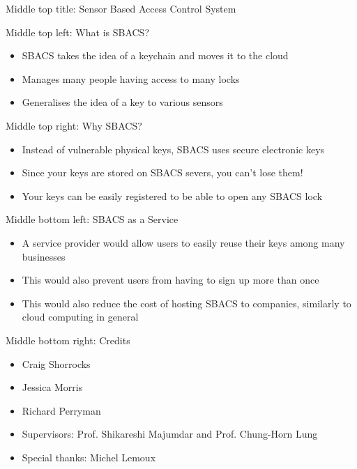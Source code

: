 \documentclass{article}
\begin{document}
Middle top title: Sensor Based Access Control System

Middle top left: What is SBACS?

\begin{itemize}

\item SBACS takes the idea of a keychain and moves it to the cloud
\item Manages many people having access to many locks
\item Generalises the idea of a key to various sensors

\end{itemize}

Middle top right: Why SBACS?

\begin{itemize}

\item Instead of vulnerable physical keys, SBACS uses secure electronic keys
\item Since your keys are stored on SBACS severs, you can't lose them!
\item Your keys can be easily registered to be able to open any SBACS lock 

\end{itemize}

Middle bottom left: SBACS as a Service

\begin{itemize}

\item A service provider would allow users to easily reuse their keys among many businesses
\item This would also prevent users from having to sign up more than once
\item This would also reduce the cost of hosting SBACS to companies, similarly to cloud computing in general

\end{itemize}

Middle bottom right: Credits

\begin{itemize}

\item Craig Shorrocks
\item Jessica Morris
\item Richard Perryman

\item Supervisors: Prof. Shikareshi Majumdar and Prof. Chung-Horn Lung

\item Special thanks: Michel Lemoux

\end{itemize}
\end{document}
